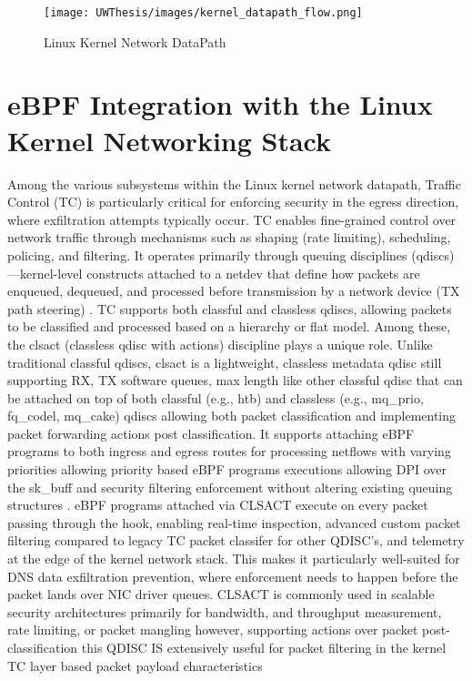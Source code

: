 \documentclass [11pt, proquest] {uwthesis}[2020/02/24]
\begin{document}
\label{sec:kernel-network-datapath}
\begin{figure}[h]
\texttt{[image: UWThesis/images/kernel\_datapath\_flow.png]}
\caption{Linux Kernel Network DataPath}
\end{figure}



\section{eBPF Integration with the Linux Kernel Networking Stack}
Among the various subsystems within the Linux kernel network datapath, Traffic Control (TC) is particularly critical for enforcing security in the egress direction, where exfiltration attempts typically occur. TC enables fine-grained control over network traffic through mechanisms such as shaping (rate limiting), scheduling, policing, and filtering. It operates primarily through queuing disciplines (qdiscs)—kernel-level constructs attached to a netdev that define how packets are enqueued, dequeued, and processed before transmission by a network device (TX path steering) \cite{salim2015linux}.
TC supports both classful and classless qdiscs, allowing packets to be classified and processed based on a hierarchy or flat model. Among these, the clsact (classless qdisc with actions) discipline plays a unique role. Unlike traditional classful qdiscs, clsact is a lightweight, classless metadata qdisc still supporting RX, TX software queues, max length like other classful qdisc that can be attached on top of both classful (e.g., htb) and classless (e.g., mq\_prio, fq\_codel, mq\_cake) qdiscs allowing both packet classification and implementing packet forwarding actions post classification. It supports attaching eBPF programs to both ingress and egress routes for processing netflows with varying priorities allowing priority based eBPF programs executions allowing DPI over the sk\_buff and security filtering enforcement without altering existing queuing structures \cite{borkmann2016getting}. 
eBPF programs attached via CLSACT execute on every packet passing through the hook, enabling real-time inspection, advanced custom packet filtering compared to legacy TC packet classifer for other QDISC's, and telemetry at the edge of the kernel network stack. This makes it particularly well-suited for DNS data exfiltration prevention, where enforcement needs to happen before the packet lands over NIC driver queues. CLSACT is commonly used in scalable security architectures primarily for bandwidth, and throughput measurement, rate limiting, or packet mangling however, supporting actions over packet post-classification this QDISC IS extensively useful for packet filtering in the kernel TC layer based packet payload characteristics
\end{document}
